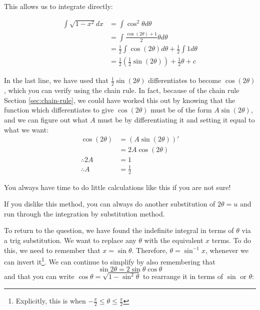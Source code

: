 \begin{solution}
    This allows us to integrate directly:

    \begin{align*}
        \int \sqrt{1 - x^2} dx &= \int \cos^2 \theta d\theta \tag{where we left off}\\
         &= \int \frac{\cos(2 \theta) + 1}{2} \theta d\theta \tag{using above identity}\\
         &= \frac{1}{2}\int \cos(2\theta) d\theta +  \frac{1}{2}\int 1 d\theta \tag{separating the integral}\\
         &= \frac{1}{2}(\frac{1}{2}\sin(2\theta))+  \frac{1}{2}\theta + c \tag{evaluating the integrals}
    \end{align*}

    In the last line, we have used that $\frac{1}{2}\sin(2\theta)$ differentiates to become $\cos(2\theta)$, which you can verify using the chain rule. In fact, because of the chain rule Section \ref{sec:chain-rule}, we could have worked this out by knowing that 
    the function which differentiates to give $\cos (2\theta)$ must be of the form $A \sin (2\theta)$, and we can figure out what $A$ must be by differentiating it and setting it equal to what we want:
    \begin{align*}
        \cos(2\theta) &= (A \sin (2\theta))' \\
         &= 2A \cos(2\theta) \tag{using the chain rule}\\
         \therefore 2A &= 1 \tag{since $\cos(2\theta) = 2A \cos(2\theta)$ }\\
         \therefore A &= \frac{1}{2}
    \end{align*}

    You always have time to do little calculations like this if you are not sure!

    If you dislike this method, you can always do another substitution of $2\theta = u$ and run through the integration by substitution method.

    To return to the question, we have found the indefinite integral in terms of $\theta$ via a trig substitution. We want to replace any $\theta$ with the equivalent $x$ terms.
    To do this, we need to remember that $x = \sin \theta$. Therefore, $\theta = \sin^{-1} x$, whenever we can invert it\footnote{Explicitly, this is when $-\frac{\pi}{2} \leq \theta \leq \frac{\pi}{2}$}. We can continue to simplify by also remembering that 
    \[ \sin 2\theta = 2 \sin \theta \cos \theta\] 
    and that you can write $\cos \theta = \sqrt{1 - \sin^2 \theta}$ to rearrange it in terms of $\sin$ or $\theta$:


\end{solution}
